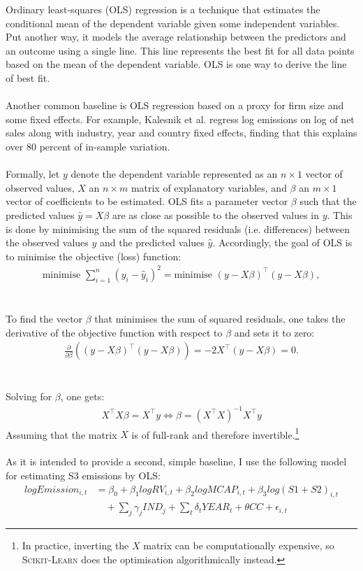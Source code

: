 \documentclass[12pt,twoside]{report}
\begin{document}
Ordinary least-squares (OLS) regression is a technique that estimates the conditional mean of the dependent variable given some independent variables. Put another way, it models the average relationship between the predictors and an outcome using a single line. This line represents the best fit for all data points based on the mean of the dependent variable. OLS is one way to derive the line of best fit.
\\\\
Another common baseline is OLS regression based on a proxy for firm size and some fixed effects. For example, Kalesnik et al. \cite{KalesnikVitali2022} regress log emissions on log of net sales along with industry, year and country fixed effects, finding that this explains over 80 percent of in-sample variation. 
\\\\
Formally, let  $y$ denote the dependent variable represented as an $n \times 1$ vector of observed values, $X$ an $n \times m$ matrix of explanatory variables, and $\beta$ an $m \times 1$ vector of coefficients to be estimated. OLS fits a parameter vector $\beta$ such that the predicted values $\hat{y}=X\beta$ are as close as possible to the observed values in $y$. This is done by minimising the sum of the squared residuals (i.e. differences) between the observed values $y$ and the predicted values $\hat{y}$. Accordingly, the goal of OLS is to minimise the objective (loss) function:
\begin{align}
    \text{minimise } \sum_{i=1}^{n} (y_i - \hat{y}_i)^2 = \text{minimise } (y - X\beta)^\top (y - X\beta),
\end{align}
\\\\
To find the vector $\beta$ that minimises the sum of squared residuals, one takes the derivative of the objective function with respect to $\beta$ and sets it to zero: 
\begin{align}
    \frac{\partial}{\partial \beta} \left( (y - X\beta)^\top (y - X\beta) \right) = -2X^\top(y - X\beta) = 0.
\end{align}
\\\\
Solving for $\beta$, one gets: 
\begin{align}
    X^\top X \beta = X^\top y \Leftrightarrow  \beta = (X^\top X)^{-1} X^\top y
\end{align}
Assuming that the matrix $X$ is of full-rank and therefore invertible.\footnote{In practice, inverting the $X$ matrix can be computationally expensive, so \textsc{Scikit-Learn} does the optimisation algorithmically instead.}
\\\\
As it is intended to provide a second, simple baseline, I use the following model for estimating S3 emissions by OLS:
\begin{align}
\mathit{logEmission_{i,t}} &= \beta_0 + \beta_1 \mathit{logRV_{i,t}} + \beta_2 \mathit{logMCAP_{i,t}} + \beta_3 \mathit{log(S1+S2)_{i,t}} \nonumber \\
&\quad + \sum_j \gamma_j \mathit{IND_j} + \sum_t \delta_t \mathit{YEAR_t} + \theta \mathit{CC} + \epsilon_{i,t}
\end{align}
\end{document}
